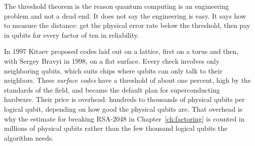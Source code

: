 The threshold theorem is the reason quantum computing is an engineering problem and
not a dead end. It does not say the engineering is easy. It says how to measure the
distance: get the physical error rate below the threshold, then pay in qubits for
every factor of ten in reliability.

In 1997 Kitaev proposed codes laid out on a lattice, first on a torus and then, with
Sergey Bravyi in 1998, on a flat surface. Every check involves only neighboring
qubits, which suits chips where qubits can only talk to their neighbors.
These \emph{surface codes} have a threshold of about one percent, high by the
standards of the field, and became the default plan for superconducting hardware.
Their price is overhead: hundreds to thousands of physical qubits per logical qubit,
depending on how good the physical qubits are. That overhead is why the estimate for
breaking RSA-2048 in Chapter~\ref{ch:factoring} is counted in millions of physical qubits rather than
the few thousand logical qubits the algorithm needs.
